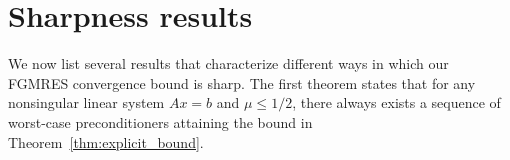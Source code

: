 \documentclass{siamart251216}
\begin{document}
{\begin{table}[ht]
    \centering
    \caption{Stalling index $m^*$ and the corresponding relative residual bound \eqref{eq:cheb_bound} for different values for $\mu$.}
    \small
    \label{tab:mum}
\end{table}


\section{Sharpness results}\label{sec:sharp}

We now list several results that characterize different ways in which our  FGMRES convergence bound is sharp. The first theorem states that for any nonsingular linear system $Ax=b$ and $\mu\leq 1/2$, there always exists a sequence of worst-case preconditioners attaining the bound in Theorem~\ref{thm:explicit_bound}.


}
\end{document}
